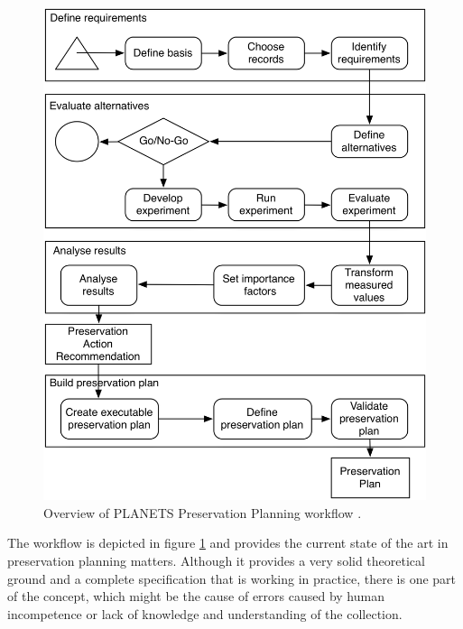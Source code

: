\begin{figure}[tbp]
\begin{center}
\includegraphics[width=5in]{figures/contentprofiling/planningworkflow.png}
\caption{Overview of PLANETS Preservation Planning workflow \cite{Becker:2008:PSO:1378889.1378954}.}
\label{fig:planningworkflow}
\end{center}
\end{figure}

The workflow is depicted in figure \ref{fig:planningworkflow} and provides the current state of the art in preservation planning matters. Although it provides a very solid theoretical ground and a complete specification that is working in practice, there is one part of the concept, which might be the cause of errors caused by human incompetence or lack of knowledge and understanding of the collection.

